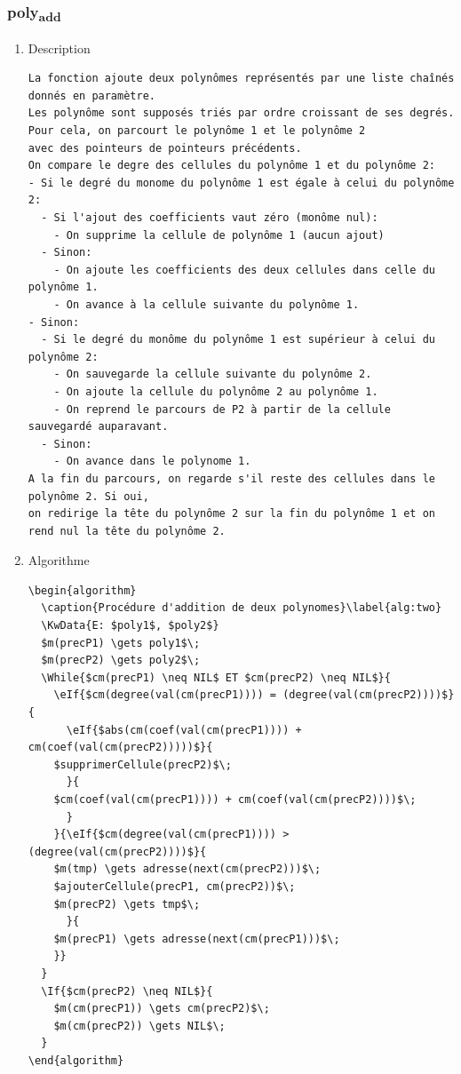\documentclass[11pt]{article}
\begin{document}
\subsubsection{poly\textsubscript{add}}
\label{sec:org4219c6a}
\begin{enumerate}
\item Description
\label{sec:orgd8fa617}

\begin{verbatim}
La fonction ajoute deux polynômes représentés par une liste chaînés donnés en paramètre.
Les polynôme sont supposés triés par ordre croissant de ses degrés.
Pour cela, on parcourt le polynôme 1 et le polynôme 2
avec des pointeurs de pointeurs précédents.
On compare le degre des cellules du polynôme 1 et du polynôme 2:
- Si le degré du monome du polynôme 1 est égale à celui du polynôme 2:
  - Si l'ajout des coefficients vaut zéro (monôme nul):
    - On supprime la cellule de polynôme 1 (aucun ajout)
  - Sinon:
    - On ajoute les coefficients des deux cellules dans celle du polynôme 1.
    - On avance à la cellule suivante du polynôme 1.
- Sinon:
  - Si le degré du monôme du polynôme 1 est supérieur à celui du polynôme 2:
    - On sauvegarde la cellule suivante du polynôme 2.
    - On ajoute la cellule du polynôme 2 au polynôme 1.
    - On reprend le parcours de P2 à partir de la cellule sauvegardé auparavant.
  - Sinon:
    - On avance dans le polynome 1.
A la fin du parcours, on regarde s'il reste des cellules dans le polynôme 2. Si oui,
on redirige la tête du polynôme 2 sur la fin du polynôme 1 et on rend nul la tête du polynôme 2.
\end{verbatim}

\item Algorithme
\label{sec:org5b76226}

\begin{verbatim}
\begin{algorithm}
  \caption{Procédure d'addition de deux polynomes}\label{alg:two}
  \KwData{E: $poly1$, $poly2$}
  $m(precP1) \gets poly1$\;
  $m(precP2) \gets poly2$\;
  \While{$cm(precP1) \neq NIL$ ET $cm(precP2) \neq NIL$}{
    \eIf{$cm(degree(val(cm(precP1)))) = (degree(val(cm(precP2))))$}{
      \eIf{$abs(cm(coef(val(cm(precP1)))) + cm(coef(val(cm(precP2)))))$}{
	$supprimerCellule(precP2)$\;
      }{
	$cm(coef(val(cm(precP1)))) + cm(coef(val(cm(precP2))))$\;
      }
    }{\eIf{$cm(degree(val(cm(precP1)))) > (degree(val(cm(precP2))))$}{
	$m(tmp) \gets adresse(next(cm(precP2)))$\;
	$ajouterCellule(precP1, cm(precP2))$\;
	$m(precP2) \gets tmp$\;
      }{
	$m(precP1) \gets adresse(next(cm(precP1)))$\;
    }}
  }
  \If{$cm(precP2) \neq NIL$}{
    $m(cm(precP1)) \gets cm(precP2)$\;
    $m(cm(precP2)) \gets NIL$\;
  }
\end{algorithm}
\end{verbatim}


\end{enumerate}
\end{document}
